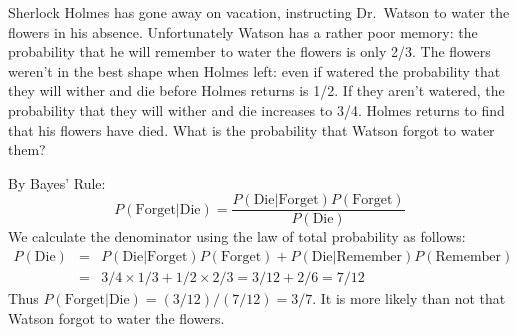 \documentclass[addpoints,12pt]{exam}
\begin{document}
\begin{questions}


  \question[15] Sherlock Holmes has gone away on vacation, instructing Dr.\ Watson to water the flowers in his absence. 
  Unfortunately Watson has a rather poor memory: the probability that he will remember to water the flowers is only 2/3.
  The flowers weren't in the best shape when Holmes left: even if watered the probability that they will wither and die before Holmes returns is 1/2.
  If they aren't watered, the probability that they will wither and die increases to 3/4. 
  Holmes returns to find that his flowers have died.
  What is the probability that Watson forgot to water them?
  \begin{solution}[2.5in]
    By Bayes' Rule:
    \begin{equation*}
      P(\mbox{Forget}|\mbox{Die}) = \frac{P(\mbox{Die}|\mbox{Forget})P(\mbox{Forget})}{P(\mbox{Die})}
    \end{equation*}
    We calculate the denominator using the law of total probability as follows:
    \begin{eqnarray*}
      P(\mbox{Die}) &=& P(\mbox{Die}|\mbox{Forget})P(\mbox{Forget})+ P(\mbox{Die}|\mbox{Remember})P(\mbox{Remember})\\
      &=& 3/4 \times 1/3 + 1/2 \times 2/3 = 3/12 + 2/6 = 7/12
    \end{eqnarray*}
    Thus $P(\mbox{Forget}|\mbox{Die}) = (3/12)/(7/12) = 3/7$.
    It is more likely than not that Watson forgot to water the flowers.
  \end{solution}


\end{questions}
\end{document}

